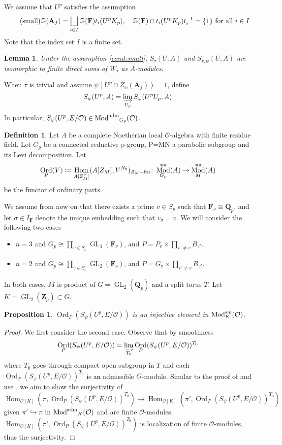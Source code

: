 \documentclass[leqno]{amsart}
\DeclareMathOperator{\Mod}{\textnormal{Mod}}
\DeclareMathOperator{\aMod}{\textnormal{Mod}^{\textnormal{adm}}}
\DeclareMathOperator{\Ord}{Ord}
\newcommand{\sm}{\textnormal{sm}}
\newcommand{\fin}{\textnormal{fin}}
\newcommand{\GG}{\mathbb G}
\DeclareMathOperator{\GL}{GL}
\newcommand{\Qp}{\mathbf{Q}_p}
\newcommand{\Zp}{\mathbf{Z}_p}
\newcommand{\A}{\mathbf A}
\newcommand{\F}{{\mathbf{F}}} %
\newcommand{\oo}{\mathcal O}
\newcommand{\1}{\mathbf{1}}
\DeclareMathOperator{\Hom}{Hom}
\newtheorem{lem}[thm]{Lemma}
\newtheorem{prop}[thm]{Proposition}
\theoremstyle{definition}
\newtheorem{defn}[thm]{Definition}
\theoremstyle{remark}
\begin{document}
We assume that $U^p$ satisfies the assumption
\begin{equation}\label{cond:small}\tag{\text{small}}
	\GG(\A_f)=\bigsqcup_{i\in I}
	\GG(\F)t_i (U^pK_p),\quad
	\GG(\F)\cap t_i(U^pK_p)t_i^{-1}=\{1\} \text{ for all } i\in I
\end{equation}
Note that the index set $I$ is a finite set.
\begin{lem}\label{lem:small}
	Under the assumption \eqref{cond:small},
	$S_\tau(U,A)$ and $S_{\tau,\psi}(U,A)$
	are isomorphic to finite direct sums
	of $W_\tau$
	as $A$-modules.
\end{lem}


When $\tau$ is trivial and assume  $\psi(U^p\cap Z_\GG(\A_f))=1$,
define 
\[
	S_\psi(U^p,A)=
	\varinjlim_{U_p}S_\psi(U^pU_p,A)
\]
In particular, 
$S_\psi(U^p,E/\oo)\in \aMod_{G_p}(\oo)$.

\begin{defn}
	Let $A$ be a complete Noetherian local  $\oo$-algebra
	with finite residue field.
	Let  $G_p$ be a connected reductive p-group,
	P=MN a parabolic subgroup and its Levi decomposition.
	Let 
	\[
		\Ord_P(V)\coloneqq 
		\Hom_{A[Z_M^+]}(A[Z_M], V^{N_0})_{Z_M-\fin}\colon
		\Mod^{\sm}_{G_p}(A)\to \Mod^{\sm}_M(A)
	\]
	be the functor of ordinary parts. 
\end{defn}
We assume from now on that 
there exists a prime $v\in S_p$
such that  $\F_v\cong \Qp$,
and let  $\sigma\in I_\F$
denote the unique embedding such that  $v_\sigma=v$.
We will consider the following two cases
\begin{itemize}
	\item $n=3$ and  $G_p\cong\prod_{v\in S_p}\GL_3(\F_v)$,
		and $P=P_v\times\prod_{v'\neq v}B_{v'}$.
	\item $n=2$ and  $G_p\cong\prod_{v\in S_p}\GL_2(\F_v)$,
		and $P=G_v\times\prod_{v'\neq v}B_{v'}$.
\end{itemize}
In both cases,
$M$ is product of  $G=\GL_2(\Qp)$
and a split torus $T$.
Let $K=\GL_2(\Zp)\subset G$.

\begin{prop}
	$\Ord_P(S_\psi(U^p,E/\oo))$ is an injective element
	in $\Mod^{\sm}_{K}(\oo)$.
\end{prop}
\begin{proof}
	We first consider the second case.
	Observe that by smoothness
	\[
		\Ord_P(S_\psi(U^p,E/\oo))=\varinjlim_{T_0}
		\Ord_P(S_\psi(U^p,E/\oo))^{T_0}
	\]
	where $T_0$ goes through compact open subgroup in  $T$
	and each $\Ord_P(S_\psi(U^p,E/\oo))^{T_0}$
	is an admissible $G$-module. 
	Similar to the proof of 
	\cite[Prop 4.2.4]{pan} and use
	\cite[Prop 2.1.3]{emeII}, we aim to show the surjectivity of
	\[
		\Hom_{\oo[K]}(\pi,\Ord_P(S_\psi(U^p,E/\oo))^{T_0})\to 
		\Hom_{\oo[K]}(\pi',\Ord_P(S_\psi(U^p,E/\oo))^{T_0})
	\]
	given $\pi'\hookrightarrow \pi$ in  $\aMod_{K}(\oo)$
	and are finite $\oo$-modules.
	$\Hom_{\oo[K]}(\pi',\Ord_P(S_\psi(U^p,E/\oo))^{T_0}) $
	is localization of finite $\oo$-modules, 
	thus the surjectivity.
\end{proof}
\end{document}
